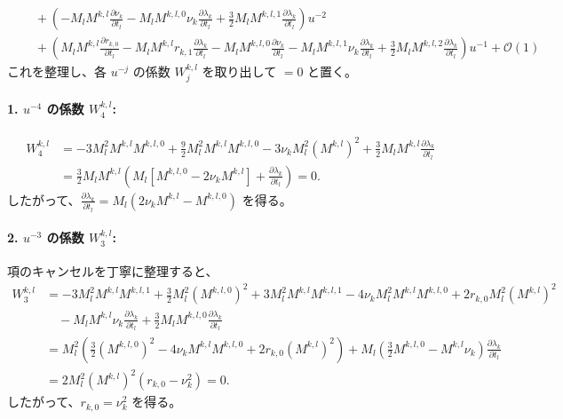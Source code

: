 \documentclass[paper=a4, fontsize=11pt]{jlreq} %
\theoremstyle{break}
\theoremstyle{qa}
\begin{document}
\begin{align*}
    &\quad + \left( - M_l M^{k,l} \frac{\partial \nu_k}{\partial t_l} - M_l M^{k,l,0} \nu_k \frac{\partial \lambda_k}{\partial t_l} + \frac{3}{2} M_l M^{k,l,1} \frac{\partial \lambda_k}{\partial t_l} \right) u^{-2} \\
    &\quad + \left( M_l M^{k,l} \frac{\partial r_{k,0}}{\partial t_l} - M_l M^{k,l} r_{k,1}\frac{\partial \lambda_{k}}{\partial t_l} - M_l M^{k,l,0} \frac{\partial \nu_k}{\partial t_l} - M_l M^{k,l,1} \nu_k \frac{\partial \lambda_k}{\partial t_l} + \frac{3}{2} M_l M^{k,l,2} \frac{\partial \lambda_k}{\partial t_l} \right) u^{-1} + \mathcal{O}(1)
\end{align*}
これを整理し、各 $u^{-j}$ の係数 $W_j^{k,l}$ を取り出して $=0$ と置く。

\paragraph{1. $u^{-4}$ の係数 $W_4^{k,l}$:}
\begin{align*}
    W_4^{k,l} &= -3 M_l^2 M^{k,l} M^{k,l,0} + \frac{9}{2} M_l^2 M^{k,l} M^{k,l,0} - 3 \nu_k M_l^2 (M^{k,l})^2 + \frac{3}{2} M_l M^{k,l} \frac{\partial \lambda_k}{\partial t_l} \\
    &= \frac{3}{2} M_l M^{k,l} \left( M_l \left[ M^{k,l,0} - 2\nu_k M^{k,l} \right] + \frac{\partial \lambda_k}{\partial t_l} \right) = 0.
\end{align*}
したがって、$\frac{\partial \lambda_k}{\partial t_l} = M_l (2 \nu_k M^{k,l} - M^{k,l,0})$ を得る。

\paragraph{2. $u^{-3}$ の係数 $W_3^{k,l}$:}
項のキャンセルを丁寧に整理すると、
\begin{align*}
    W_3^{k,l} &= -3 M_l^2 M^{k,l} M^{k,l,1} + \frac{3}{2} M_l^2 (M^{k,l,0})^2 + 3 M_l^2 M^{k,l} M^{k,l,1} - 4 \nu_k M_l^2 M^{k,l} M^{k,l,0} + 2r_{k,0} M_l^2 (M^{k,l})^2 \\
    &\quad - M_l M^{k,l} \nu_k \frac{\partial \lambda_k}{\partial t_l} + \frac{3}{2} M_l M^{k,l,0} \frac{\partial \lambda_k}{\partial t_l} \\
    &= M_l^2 \left( \frac{3}{2} (M^{k,l,0})^2 - 4\nu_k M^{k,l} M^{k,l,0} + 2r_{k,0}(M^{k,l})^2 \right) + M_l \left( \frac{3}{2} M^{k,l,0} - M^{k,l}\nu_k \right) \frac{\partial \lambda_k}{\partial t_l} \\
    &= 2 M_l^2 (M^{k,l})^2 \left( r_{k,0} - \nu_k^2 \right) = 0.
\end{align*}
したがって、$r_{k,0} = \nu_k^2$ を得る。
\end{document}
